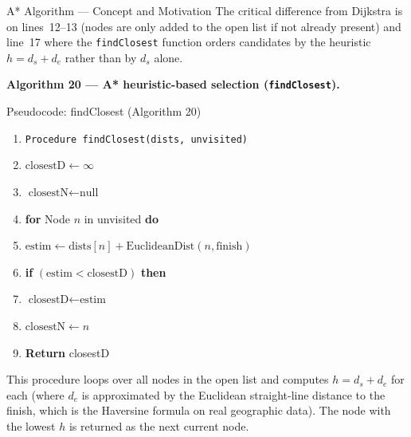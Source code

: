 \documentclass[aspectratio=169,10pt]{beamer}
\begin{document}
\begin{frame}[allowframebreaks]{A* Algorithm --- Concept and Motivation}
  \medskip
  The critical difference from Dijkstra is on lines~12--13 (nodes are only
  added to the open list if not already present) and line~17 where the
  \texttt{findClosest} function orders candidates by the heuristic $h =
  d_s + d_e$ rather than by $d_s$ alone.

  \framebreak

  \textbf{Algorithm 20 --- A* heuristic-based selection (\texttt{findClosest}).}

  \begin{block}{Pseudocode: findClosest (Algorithm 20)}
  \begin{enumerate}\setcounter{enumi}{0}
    \item[\footnotesize 1:] \texttt{Procedure findClosest(dists, unvisited)}
    \item[\footnotesize 2:] \quad $\text{closestD} \leftarrow \infty$
    \item[\footnotesize 3:] \quad $\text{closestN} \leftarrow \text{null}$
    \item[\footnotesize 4:] \quad \textbf{for} Node $n$ in unvisited
      \textbf{do}
    \item[\footnotesize 5:] \qquad $\text{estim} \leftarrow
      \text{dists}[n] + \text{EuclideanDist}(n, \text{finish})$
    \item[\footnotesize 6:] \qquad \textbf{if} $(\text{estim} <
      \text{closestD})$ \textbf{then}
    \item[\footnotesize 7:] \qquad\quad $\text{closestD} \leftarrow
      \text{estim}$
    \item[\footnotesize 8:] \qquad\quad $\text{closestN} \leftarrow n$
    \item[\footnotesize 9:] \quad \textbf{Return} closestD
  \end{enumerate}
  \end{block}

  This procedure loops over all nodes in the open list and computes $h =
  d_s + d_e$ for each (where $d_e$ is approximated by the Euclidean
  straight-line distance to the finish, which is the Haversine formula on
  real geographic data).  The node with the lowest $h$ is returned as the
  next current node.
\end{frame}
\end{document}
